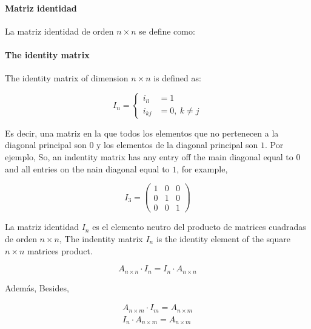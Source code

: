 \begin{paracol}{2}
\paragraph{Matriz identidad} La matriz identidad de orden $n\times n$ se 
define como:
\switchcolumn
\paragraph{The identity matrix } The identity matrix of dimension $n\times n$ is defined as:
\end{paracol}
\begin{equation*}
I_n= \left\{ 
\begin{aligned}
i_{ll}&=1\\
i_{kj}&=0, \ k\neq j
\end{aligned}
\right.
\end{equation*}

\begin{paracol}{2}
Es decir, una matriz en la que todos los elementos que no pertenecen a la diagonal principal son $0$ y los elementos de la diagonal principal son $1$. Por ejemplo,
\switchcolumn
So, an indentity matrix has any entry off the main diagonal equal to $0$ and all entries on the nain diagonal equal to $1$, for example,    
\end{paracol}

\begin{equation*}
I_3=\begin{pmatrix}
1& 0& 0\\
0& 1& 0\\
0& 0& 1
\end{pmatrix}
\end{equation*}

\begin{paracol}{2}
La matriz identidad $I_n$ es el elemento neutro del producto de matrices cuadradas de orden $n\times n$,
\switchcolumn
The indentity matrix $I_n$ is the identity element of the square $n \times n$ matrices product.    
\end{paracol}

\begin{equation*}
A_{n\times n}\cdot I_n=I_n\cdot A_{n\times n}
\end{equation*}
\begin{paracol}{2}
Además,
\switchcolumn
Besides,
\end{paracol}
\begin{gather*}
A_{n\times m}\cdot I_m=A_{n \times m}\\
I_n\cdot A_{n\times m}=A_{n\times m}
\end{gather*}


